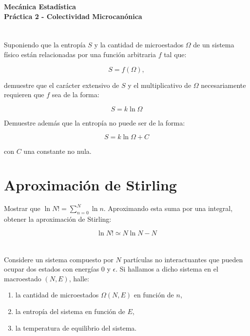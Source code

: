 \documentclass[a4paper,11pt]{article}
\begin{document}
\pagestyle{fancy}
\chead{\small \the\year}



\thispagestyle{plain}
\begin{center}
    \textbf{\large
        Mecánica Estadística \\
        Práctica 2 - Colectividad Microcanónica
    }
\end{center}
\vspace{-1.5em}



\section{}

Suponiendo que la entropía $S$ y la cantidad de microestados
$\Omega$ de un sistema físico están relacionadas por una función
arbitraria $f$ tal que:

$$ S = f(\Omega), $$

\noindent demuestre que el carácter extensivo de $S$ y el multiplicativo de
$\Omega$ necesariamente requieren que $f$ sea de la forma:

$$ S = k \ln \Omega $$

Demuestre además que la entropía no puede ser de la forma:

$$ S = k \ln \Omega + C $$

\noindent con $C$ una constante no nula.


\section{Aproximación de Stirling}

Mostrar que $\ln N! = \sum_{n=0}^N \ln n$.
Aproximando esta suma por una integral, obtener la aproximación de
Stirling:

$$ \ln N! \simeq N \ln N - N $$


\section{}

Considere un sistema compuesto por $N$ partículas no interactuantes que pueden ocupar
dos estados con energías 0 y $\epsilon$.
Si hallamos a dicho sistema en el macroestado $(N, E)$, halle:

\begin{enumerate}[label=(\alph*),
                  leftmargin=2\parindent,
                  rightmargin=2\parindent]

    \item{la cantidad de microestados $\Omega(N, E)$ en función de $n$,}

    \item{la entropía del sistema en función de $E$,}

    \item{la temperatura de equilibrio del sistema.}

\end{enumerate}
\end{document}
